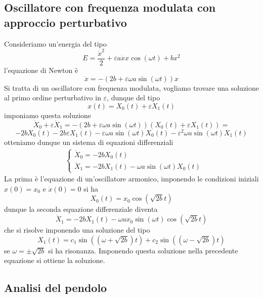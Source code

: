 \documentclass[
10pt, %
a4paper, %
oneside, %
headinclude,footinclude, %
BCOR5mm, %
]{scrartcl}
\begin{document}
\subsection{Oscillatore con frequenza modulata con approccio perturbativo}
Consideriamo un'energia del tipo
\[E = \frac{\dot{x}^2}{2}+\varepsilon a\dot{x}x\cos(\omega t)+bx^2\]
l'equazione di Newton è
\[\ddot{x} = -(2b+\varepsilon\omega a\sin(\omega t))x\]
Si tratta di un oscillatore con frequenza modulata, vogliamo trovare una soluzione al primo ordine perturbativo in $\varepsilon$, dunque del tipo
\[x(t) = X_0(t)+\varepsilon X_1(t)\]
imponiamo questa soluzione 
\[\ddot{X}_0+\varepsilon\ddot{X}_1 = -(2b+\varepsilon\omega a\sin(\omega t))(X_0(t)+\varepsilon X_1(t)) =\]
\[ -2bX_0(t)-2b\varepsilon X_1(t)-\varepsilon\omega a\sin(\omega t)X_0(t)-\varepsilon^2\omega a\sin(\omega t)X_1(t)\]
otteniamo dunque un sistema di equazioni differenziali
\begin{align*}
	&\begin{cases}
		\ddot{X}_0 = -2bX_0(t)\\
		\ddot{X}_1 = -2bX_1(t)-\omega a \sin(\omega t)X_0(t)
	\end{cases}
\end{align*}
La prima è l'equazione di un'oscillatore armonico, imponendo le condizioni iniziali \(x(0) = x_0\) e \(\dot{x}(0) = 0\) si ha
\[X_0(t) = x_0\cos(\sqrt{2b}t)\]
dunque la seconda equazione differenziale diventa
\[\ddot{X}_1 = -2bX_1(t)-\omega a x_0\sin(\omega t)\cos(\sqrt{2b}t)\]
che si risolve imponendo una soluzione del tipo
\[X_1(t) = c_1\sin((\omega + \sqrt{2b})t)+c_2\sin((\omega - \sqrt{2b})t)\]
se \(\omega = \pm \sqrt{2b}\) si ha risonanza. Imponendo questa soluzione nella precedente equazione si ottiene la soluzione.
\subsection{Analisi del pendolo}
\end{document}
